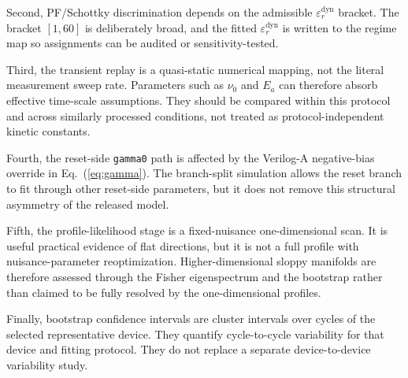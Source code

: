 \documentclass[journal]{IEEEtran}
\begin{document}
Second, PF/Schottky discrimination depends on the admissible
$\varepsilon_r^{\mathrm{dyn}}$ bracket.  The bracket $[1,60]$ is deliberately
broad, and the fitted $\varepsilon_r^{\mathrm{dyn}}$ is written to the regime
map so assignments can be audited or sensitivity-tested.

Third, the transient replay is a quasi-static numerical mapping, not the
literal measurement sweep rate.  Parameters such as $\nu_0$ and $E_a$ can
therefore absorb effective time-scale assumptions.  They should be compared
within this protocol and across similarly processed conditions, not treated as
protocol-independent kinetic constants.

Fourth, the reset-side \texttt{gamma0} path is affected by the Verilog-A
negative-bias override in Eq.~(\ref{eq:gamma}).  The branch-split simulation
allows the reset branch to fit through other reset-side parameters, but it
does not remove this structural asymmetry of the released model.

Fifth, the profile-likelihood stage is a fixed-nuisance one-dimensional scan.
It is useful practical evidence of flat directions, but it is not a full
profile with nuisance-parameter reoptimization.  Higher-dimensional sloppy
manifolds are therefore assessed through the Fisher eigenspectrum and the
bootstrap rather than claimed to be fully resolved by the one-dimensional
profiles.

Finally, bootstrap confidence intervals are cluster intervals over cycles of
the selected representative device.  They quantify cycle-to-cycle variability
for that device and fitting protocol.  They do not replace a separate
device-to-device variability study.
\end{document}
